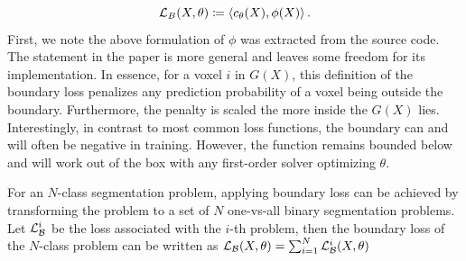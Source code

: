 \documentclass[onecolumn]{article}
\begin{document}
\begin{equation}
    \mathcal{L}_B(X, \theta) \coloneqq \left \langle c_\theta(X), \phi(X) \right \rangle.
\end{equation}
First, we note the above formulation of $\phi$ was extracted from the source code. The statement in the paper is more general and leaves some freedom for its implementation. In essence, for a voxel $i$ in $G(X)$, this definition of the boundary loss penalizes any prediction probability of a voxel being outside the boundary. Furthermore, the penalty is scaled the more inside the $G(X)$ lies. Interestingly, in contrast to most common loss functions, the boundary can and will often be negative in training. However, the function remains bounded below and will work out of the box with any first-order solver optimizing $\theta$.

For an $N$-class segmentation problem, applying boundary loss can be achieved by transforming the problem to a set of $N$ one-vs-all binary segmentation problems. Let $\mathcal{L}^i_{\cal B}$ be the loss associated with the $i$-th problem, then the boundary loss of the $N$-class problem can be written as $\mathcal{L}_{\cal B}(X, \theta)=\sum_{i=1}^N \mathcal{L}^i_{\cal B}(X,\theta)$
\label{sec:multiclass}



\end{document}
